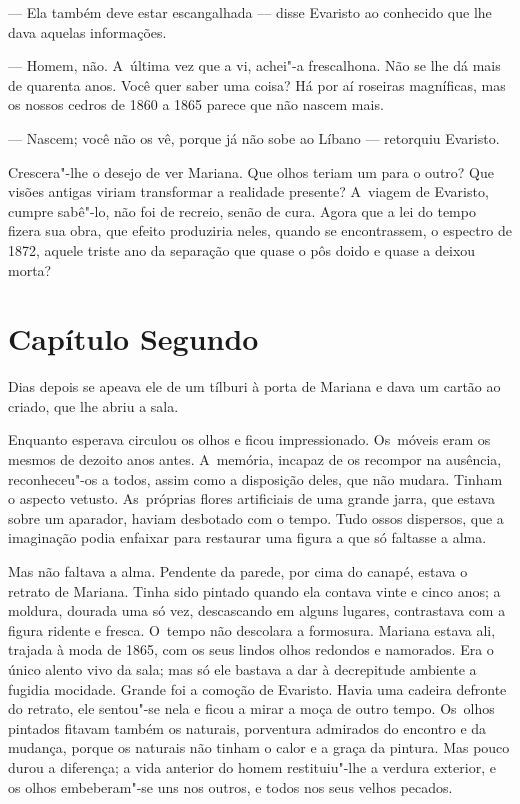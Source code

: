 \begin{linenumbers}
--- Ela também deve estar escangalhada --- disse Evaristo ao conhecido que
lhe dava aquelas informações.

--- Homem, não. A~última vez que a vi, achei"-a frescalhona. Não se lhe dá
mais de quarenta anos. Você quer saber uma coisa? Há por aí roseiras
magníficas, mas os nossos cedros de 1860 a 1865 parece que não nascem
mais.

--- Nascem; você não os vê, porque já não sobe ao Líbano --- retorquiu
Evaristo.

Crescera"-lhe o desejo de ver Mariana. Que olhos teriam um para o outro?
Que visões antigas viriam transformar a realidade presente? A~viagem de
Evaristo, cumpre sabê"-lo, não foi de recreio, senão de cura. Agora que a
lei do tempo fizera sua obra, que efeito produziria neles, quando se
encontrassem, o espectro de 1872, aquele triste ano da separação que
quase o pôs doido e quase a deixou morta?

\section{Capítulo Segundo}

Dias depois se apeava ele de um tílburi à porta de Mariana e dava um
cartão ao criado, que lhe abriu a sala.

Enquanto esperava circulou os olhos e ficou impressionado. Os~móveis
eram os mesmos de dezoito anos antes. A~memória, incapaz de os recompor
na ausência, reconheceu"-os a todos, assim como a disposição deles, que
não mudara. Tinham o aspecto vetusto. As~próprias flores artificiais de
uma grande jarra, que estava sobre um aparador, haviam desbotado com o
tempo. Tudo ossos dispersos, que a imaginação podia enfaixar para
restaurar uma figura a que só faltasse a alma.

Mas não faltava a alma. Pendente da parede, por cima do canapé, estava o
retrato de Mariana. Tinha sido pintado quando ela contava vinte e cinco
anos; a moldura, dourada uma só vez, descascando em alguns lugares,
contrastava com a figura ridente e fresca. O~tempo não descolara a
formosura. Mariana estava ali, trajada à moda de 1865, com os seus
lindos olhos redondos e namorados. Era o único alento vivo da sala; mas
só ele bastava a dar à decrepitude ambiente a fugidia mocidade. Grande
foi a comoção de Evaristo. Havia uma cadeira defronte do retrato, ele
sentou"-se nela e ficou a mirar a moça de outro tempo. Os~olhos pintados
fitavam também os naturais, porventura admirados do encontro e da
mudança, porque os naturais não tinham o calor e a graça da pintura. Mas
pouco durou a diferença; a vida anterior do homem restituiu"-lhe a
verdura exterior, e os olhos embeberam"-se uns nos outros, e todos nos
seus velhos pecados.


\end{linenumbers}
